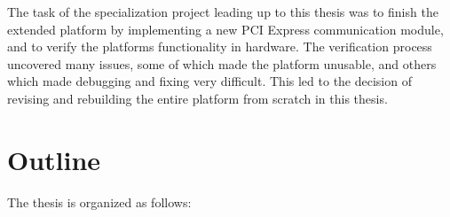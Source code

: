 The task of the specialization project leading up to this thesis was to finish the extended platform by implementing a new PCI Express communication module, and to verify the platforms functionality in hardware.
The verification process uncovered many issues, some of which made the platform unusable, and others which made debugging and fixing very difficult.
This led to the decision of revising and rebuilding the entire platform from scratch in this thesis.


\section{Outline}

The thesis is organized as follows:

